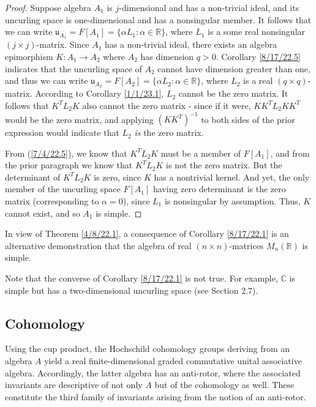 \documentclass{amsart}
\numberwithin{equation}{section}
\theoremstyle{definition}
\numberwithin{theorem}{section}
\begin{document}
\begin{proof} Suppose algebra $A_1$ is $j$-dimensional and has a non-trivial ideal, and its uncurling space is one-dimensional and has a nonsingular member.  It follows that we can write $\mathfrak{u}_{A_1} = F[A_1] = \{\alpha L_1:\alpha\in \mathbb{R}\}$, where $L_1$ is a some real nonsingular $(j\times j)$-matrix.  Since $A_1$ has a non-trivial ideal, there exists an algebra epimorphism $K:A_1\rightarrow A_2$ where $A_2$ has dimension $q>0$.  Corollary \ref{8/17/22.5} indicates that the uncurling space of $A_2$ cannot have dimension greater than one, and thus we can write $\mathfrak{u}_{A_2} = F[A_2] = \{\alpha L_2:\alpha\in \mathbb{R}\}$, where $L_2$ is a real $(q\times q)$-matrix.  According to Corollary \ref{1/1/23.1}, $L_2$ cannot be the zero matrix. It follows that $K^T L_2 K$ also cannot the zero matrix - since if it were, $KK^T L_2 KK^T$ would be the zero matrix, and applying $(KK^T)^{-1}$ to both sides of the prior expression would indicate that $L_2$ {\it is} the zero matrix.  

From (\ref{7/4/22.5}), we know that $ K^T L_2 K$ must be a member of $F[A_1]$, and from the prior paragraph we know that $ K^T L_2 K$ is not the zero matrix.  But the determinant of $K^T L_2 K$ is zero, since $K$ has a  nontrivial kernel.  And yet, the only member of the uncurling space $F[A_1]$ having zero determinant is the zero matrix (corresponding to $\alpha=0$), since $L_1$ is nonsingular by assumption.   Thus, $K$ cannot exist, and so $A_1$ is simple. \end{proof}

In view of Theorem \ref{4/8/22.1}, a consequence of Corollary \ref{8/17/22.1} is an alternative demonstration that the algebra of real $(n\times n)$-matrices $ M_n(\mathbb{R})$ is simple.  

Note that the converse of Corollary \ref{8/17/22.1} is not true.  For example, $\mathbb{C}$ is simple but has a two-dimensional uncurling space (see Section 2.7).

\subsection{Cohomology} 
Using the cup product, the Hochschild cohomology groups deriving from an algebra $A$ yield a real finite-dimensional graded commutative unital associative algebra.  Accordingly, the latter algebra has an anti-rotor, where the associated invariants are descriptive of not only $A$ but of the cohomology as well.  These constitute the third family of invariants arising from the notion of an anti-rotor.
\end{document}
